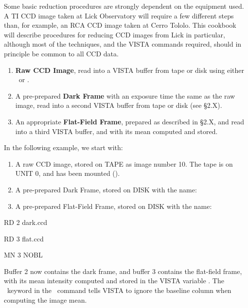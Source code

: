 Some basic reduction procedures are strongly dependent on the equipment used.
A TI CCD image taken at Lick Observatory will require a few different steps
than, for example, an RCA CCD image taken at Cerro Tololo. This cookbook will
describe procedures for reducing CCD images from Lick in particular, although
most of the techniques, and the VISTA commands required, should in principle
be common to all CCD data. 

\begin{enumerate}
      \item {\bf Raw CCD Image}, read into a VISTA buffer from tape or disk 
            using either \ or .  
      \item A pre-prepared {\bf Dark Frame} with an exposure time the same as 
            the raw image, read into a second VISTA buffer from tape or disk
            (see \S2.X).
      \item An appropriate {\bf Flat-Field Frame}, prepared as described 
            in \S2.X, and read into a third VISTA buffer, and with its mean 
            computed and stored.
\end{enumerate}
In the following example, we start with:
\begin{enumerate}
      \item A raw CCD image, stored on TAPE as image number 10. The tape is
            on UNIT 0, and has been mounted ().
      \item A pre-prepared Dark Frame, stored on DISK with the name: 
      \item A pre-prepared Flat-Field Frame, stored on DISK with the name: 
\end{enumerate}

\begin{command}
      \item RD 2 dark.ccd 
      \item RD 3 flat.ccd 
      \item MN 3 NOBL
\end{command}
Buffer 2 now contains the dark frame, and buffer 3 contains the flat-field
frame, with its mean intensity computed and stored in 
the VISTA variable .  The \ keyword in the \ 
command tells VISTA to ignore the baseline column when computing the image
mean.

